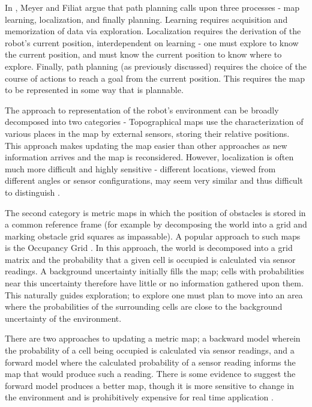 \documentclass[authoryearcitations]{UoYCSproject}
\begin{document}
In  \cite{meyer}, Meyer and Filiat argue that path planning calls upon three processes - map learning, localization, and finally planning. Learning requires acquisition and memorization of data via exploration. Localization requires the derivation of the robot's current position, interdependent on learning - one must explore to know the current position, and must know the current position to know where to explore. Finally, path planning (as previously discussed) requires the choice of the course of actions to reach a goal from the current position. This requires the map to be represented in some way that is plannable.

The approach to representation of the robot's environment can be broadly decomposed into two categories - Topographical maps use the characterization of various places in the map by external sensors, storing their relative positions. This approach makes updating the map easier than other approaches as new information arrives and the map is reconsidered. However, localization is often much more difficult and highly sensitive - different locations, viewed from different angles or sensor configurations, may seem very similar and thus difficult to distinguish \cite{meyer}.

The second category is metric maps in which the position of obstacles is stored in a common reference frame (for example by decomposing the world into a grid and marking obstacle grid squares as impassable). A popular approach to such maps is the Occupancy Grid \cite{elfes}. In this approach, the world is decomposed into a grid matrix and the probability that a given cell is occupied is calculated via sensor readings. A background uncertainty initially fills the map; cells with probabilities near this uncertainty therefore have little or no information gathered upon them. This naturally guides exploration; to explore one must plan to move into an area where the probabilities of the surrounding cells are close to the background uncertainty of the environment.

There are two approaches to updating a metric map; a backward model wherein the probability of a cell being occupied is calculated via sensor readings, and a forward model where the calculated probability of a sensor reading informs the map that would produce such a reading. There is some evidence to suggest the forward model produces a better map, though it is more sensitive to change in the environment and is prohibitively expensive for real time application \cite{thrun}.
\end{document}
